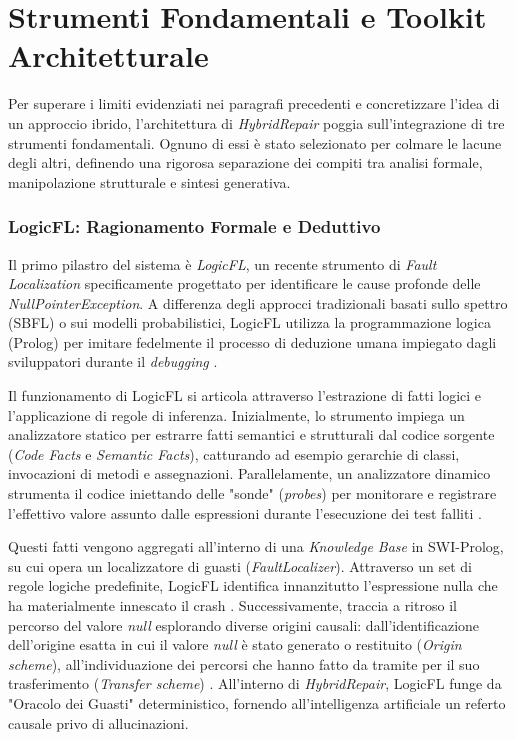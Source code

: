 \chapter{Strumenti Fondamentali e Toolkit Architetturale}

Per superare i limiti evidenziati nei paragrafi precedenti e concretizzare l'idea di un approccio ibrido, 
l'architettura di \textit{HybridRepair} poggia sull'integrazione di tre strumenti fondamentali. 
Ognuno di essi è stato selezionato per colmare le lacune degli altri, definendo una rigorosa separazione dei 
compiti tra analisi formale, manipolazione strutturale e sintesi generativa.

\subsection{LogicFL: Ragionamento Formale e Deduttivo}
Il primo pilastro del sistema è \textit{LogicFL}, un recente strumento di \textit{Fault Localization} 
specificamente progettato per identificare le cause profonde delle \textit{NullPointerException}. 
A differenza degli approcci tradizionali basati sullo spettro (SBFL) o sui modelli probabilistici, 
LogicFL utilizza la programmazione logica (Prolog) per imitare fedelmente il processo di deduzione 
umana impiegato dagli sviluppatori durante il \textit{debugging} \cite{kim2024identifying}. 

Il funzionamento di LogicFL si articola attraverso l'estrazione di fatti logici e l'applicazione di 
regole di inferenza. Inizialmente, lo strumento impiega un analizzatore statico per estrarre fatti 
semantici e strutturali dal codice sorgente (\textit{Code Facts} e \textit{Semantic Facts}), catturando 
ad esempio gerarchie di classi, invocazioni di metodi e assegnazioni. Parallelamente, 
un analizzatore dinamico strumenta il codice iniettando delle "sonde" (\textit{probes}) per monitorare 
e registrare l'effettivo valore assunto dalle espressioni durante l'esecuzione dei test falliti \cite{kim2024identifying}. 

Questi fatti vengono aggregati all'interno di una \textit{Knowledge Base} in SWI-Prolog, 
su cui opera un localizzatore di guasti (\textit{FaultLocalizer}). Attraverso un 
set di regole logiche predefinite, LogicFL identifica innanzitutto l'espressione nulla che ha 
materialmente innescato il crash \cite{kim2024identifying}. Successivamente, traccia a ritroso 
il percorso del valore \textit{null} esplorando diverse origini causali: dall'identificazione 
dell'origine esatta in cui il valore \textit{null} è stato generato o restituito (\textit{Origin scheme}), 
all'individuazione dei percorsi che hanno fatto da tramite per il suo trasferimento (\textit{Transfer scheme}) 
\cite{kim2024identifying}. All'interno di \textit{HybridRepair}, LogicFL funge da "Oracolo dei Guasti" deterministico, 
fornendo all'intelligenza artificiale un referto causale privo di allucinazioni.

